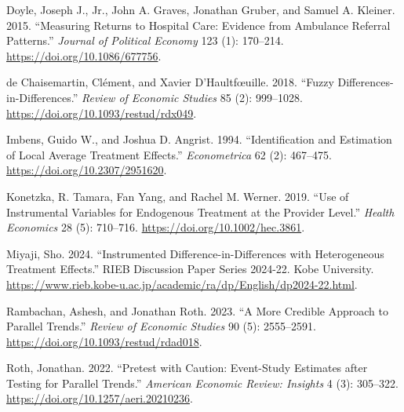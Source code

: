 \documentclass[
  11pt,
]{article}
\begin{document}
Doyle, Joseph J., Jr., John A. Graves, Jonathan Gruber, and Samuel A.
Kleiner. 2015. ``Measuring Returns to Hospital Care: Evidence from
Ambulance Referral Patterns.'' \emph{Journal of Political Economy} 123
(1): 170--214. \url{https://doi.org/10.1086/677756}.

de Chaisemartin, Clément, and Xavier D'Haultfœuille. 2018. ``Fuzzy
Differences-in-Differences.'' \emph{Review of Economic Studies} 85 (2):
999--1028. \url{https://doi.org/10.1093/restud/rdx049}.

Imbens, Guido W., and Joshua D. Angrist. 1994. ``Identification and
Estimation of Local Average Treatment Effects.'' \emph{Econometrica} 62
(2): 467--475. \url{https://doi.org/10.2307/2951620}.

Konetzka, R. Tamara, Fan Yang, and Rachel M. Werner. 2019. ``Use of
Instrumental Variables for Endogenous Treatment at the Provider Level.''
\emph{Health Economics} 28 (5): 710--716.
\url{https://doi.org/10.1002/hec.3861}.

Miyaji, Sho. 2024. ``Instrumented Difference-in-Differences with
Heterogeneous Treatment Effects.'' RIEB Discussion Paper Series 2024-22.
Kobe University.
\url{https://www.rieb.kobe-u.ac.jp/academic/ra/dp/English/dp2024-22.html}.

Rambachan, Ashesh, and Jonathan Roth. 2023. ``A More Credible Approach
to Parallel Trends.'' \emph{Review of Economic Studies} 90 (5):
2555--2591. \url{https://doi.org/10.1093/restud/rdad018}.

Roth, Jonathan. 2022. ``Pretest with Caution: Event-Study Estimates
after Testing for Parallel Trends.'' \emph{American Economic Review:
Insights} 4 (3): 305--322. \url{https://doi.org/10.1257/aeri.20210236}.

\endgroup
\end{document}
